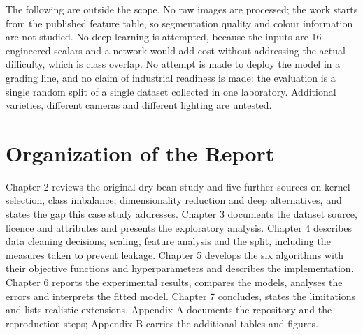 The following are outside the scope. No raw images are processed; the work starts
from the published feature table, so segmentation quality and colour information
are not studied. No deep learning is attempted, because the inputs are 16
engineered scalars and a network would add cost without addressing the actual
difficulty, which is class overlap. No attempt is made to deploy the model in a
grading line, and no claim of industrial readiness is made: the evaluation is a
single random split of a single dataset collected in one laboratory. Additional
varieties, different cameras and different lighting are untested.

\section{Organization of the Report}

Chapter 2 reviews the original dry bean study and five further sources on kernel
selection, class imbalance, dimensionality reduction and deep alternatives, and
states the gap this case study addresses. Chapter 3 documents the dataset source,
licence and attributes and presents the exploratory analysis. Chapter 4 describes
data cleaning decisions, scaling, feature analysis and the split, including the
measures taken to prevent leakage. Chapter 5 develops the six algorithms with
their objective functions and hyperparameters and describes the implementation.
Chapter 6 reports the experimental results, compares the models, analyses the
errors and interprets the fitted model. Chapter 7 concludes, states the
limitations and lists realistic extensions. Appendix A documents the repository
and the reproduction steps; Appendix B carries the additional tables and figures.
